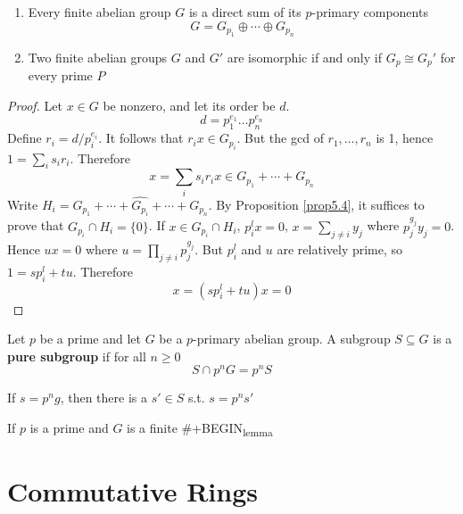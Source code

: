 \documentclass[11pt]{article}
\begin{document}
\begin{theorem}
\begin{enumerate}
\item Every finite abelian group \(G\) is a direct sum of its \(p\)-primary
components
\begin{equation*}
G=G_{p_1}\oplus\cdots\oplus G_{p_n}
\end{equation*}
\item Two finite abelian groups \(G\) and \(G'\) are isomorphic if and only if
\(G_p\cong G_p'\) for every prime \(P\)
\end{enumerate}
\end{theorem}

\begin{proof}
Let \(x\in G\) be nonzero, and let its order be \(d\).
\begin{equation*}
d=p_1^{e_1}\dots p_n^{e_n}
\end{equation*}
Define \(r_i=d/p_i^{e_i}\). It follows that \(r_ix\in G_{p_i}\). But the gcd
of \(r_1,\dots,r_n\) is 1, hence \(1=\sum_is_ir_i\). Therefore
\begin{equation*}
x=\displaystyle\sum_{i}s_ir_ix\in G_{p_1}+\cdots+G_{p_n}
\end{equation*}
Write \(H_i=G_{p_1}+\cdots+\widehat{G_{p_i}}+\cdots+G_{p_n}\). By
Proposition \ref{prop5.4}, it suffices to prove that 
\(G_{p_i}\cap H_i=\{0\}\). If \(x\in G_{p_i}\cap H_i\), \(p_i^lx=0\), 
\(x=\sum_{j\neq i}y_j\) where \(p_j^{g_j}y_j=0\). Hence 
\(ux=0\) where \(u=\prod_{j\neq i}p_j^{g_j}\). But \(p_i^l\) and \(u\) are
relatively prime, so \(1=sp_i^l+tu\). Therefore
\begin{equation*}
x=(sp_i^l+tu)x=0
\end{equation*}
\end{proof}

\begin{definition}[]
Let \(p\) be a prime and let \(G\) be a \(p\)-primary abelian group. A subgroup
\(S\subseteq G\) is a \textbf{pure subgroup} if for all \(n\ge 0\)
\begin{equation*}
S\cap p^nG=p^nS
\end{equation*}
\end{definition}

If \(s=p^ng\), then there is a \(s'\in S\) s.t. \(s=p^ns'\)

\begin{lemma}[]
If \(p\) is a prime and \(G\) is a finite 
\#+BEGIN\textsubscript{lemma}
\end{lemma}
\section{Commutative Rings }
\label{sec:org3f0b8c7}
\end{document}
